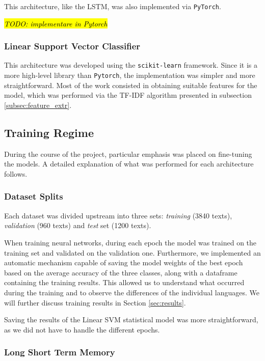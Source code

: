 \documentclass[letterpaper,11pt]{article}
\begin{document}
This architecture, like the LSTM, was also implemented via \verb|PyTorch|.

\hl{\textit{TODO: implementare in Pytorch}}


\subsubsection*{Linear Support Vector Classifier}

This architecture was developed using the \verb|scikit-learn| framework. Since it is a more high-level library than \verb|Pytorch|, the implementation was simpler and more straightforward. Most of the work consisted in obtaining suitable features for the model, which was performed via the TF-IDF algorithm presented in subsection \ref{subsec:feature_extr}.

\subsection{Training Regime}
\label{subsec:fine_tuning}

During the course of the project, particular emphasis was placed on fine-tuning the models. A detailed explanation of what was performed for each architecture follows.

\subsubsection*{Dataset Splits}

Each dataset was divided upstream into three sets: \textit{training} (3840 texts), \textit{validation} (960 texts) and \textit{test} set (1200 texts). 

When training neural networks, during each epoch the model was trained on the training set and validated on the validation one. Furthermore, we implemented an automatic mechanism capable of saving the model weights of the best epoch based on the average accuracy of the three classes, along with a dataframe containing the training results. This allowed us to understand what occurred during the training and to observe the differences of the individual languages. We will further discuss training results in Section \ref{sec:results}.

Saving the results of the Linear SVM statistical model was more straightforward, as we did not have to handle the different epochs.

\subsubsection*{Long Short Term Memory}
\end{document}
